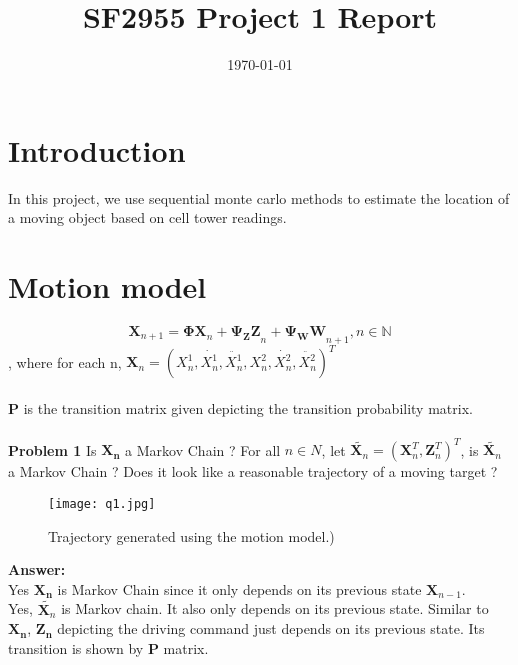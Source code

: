\documentclass[a4paper]{article}
\title{SF2955 Project 1 Report}
\author{}
\date{\today}
\begin{document}
\maketitle



\section*{Introduction}

In this project, we use sequential monte carlo methods to estimate the location of a moving object based on cell tower readings.

\section*{Motion model}

\begin{equation}
\boldsymbol{X}_{n + 1} = \boldsymbol{\Phi X}_n + \boldsymbol{\Psi_Z Z}_n + \boldsymbol{\Psi_W W}_{n + 1}, n \in \mathbb{N} \label{trans_model}
\end{equation}
, where for each n, $\boldsymbol{X}_n = (X_n^1, \dot{X_n^1}, \ddot{X_n^1}, X_n^2, \dot{X_n^2}, \ddot{X_n^2})^T$ \\\\
$\boldsymbol{P}$ is the transition matrix given depicting the transition probability matrix.  
\\\\

\textbf{Problem 1}
Is ${\boldsymbol{X_n}}$ a Markov Chain ?  For all $n \in N$, let $\tilde{\boldsymbol{X}_n} = (\boldsymbol{X}_n^T, \boldsymbol{Z}_n^T)^T$, is $\tilde{\boldsymbol{X}_n}$ a Markov Chain ?  Does it look like a reasonable trajectory of a moving target ?\\

\begin{figure}[ht!]
\centering
\texttt{[image: q1.jpg]}
\caption{Trajectory generated using the motion model.) \label{q1}}
\end{figure}

\textbf{Answer:} \\
Yes ${\mathbf{X_n}}$ is Markov Chain since it only depends on its previous state ${\mathbf{X}_{n-1}}$. \\
Yes, $\tilde{\mathbf{X}_n}$ is Markov chain. It also only depends on its previous state. Similar to  ${\mathbf{X_n}}$, ${\mathbf{Z_n}}$ depicting the driving command just depends on its previous state. Its transition is shown by $\mathbf{P}$ matrix. \\
\end{document}
